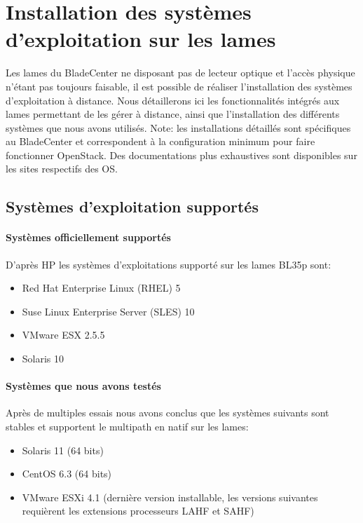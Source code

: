 \documentclass[a4paper,oneside]{report}
\begin{document}
\chapter{Installation des systèmes d'exploitation sur les lames} \label{sec:installos}
Les lames du BladeCenter ne disposant pas de lecteur optique et l'accès physique n'étant pas toujours faisable, il est possible de réaliser l'installation des systèmes d'exploitation à distance.
Nous détaillerons ici les fonctionnalités intégrés aux lames permettant de les gérer à distance, ainsi que l'installation des différents systèmes que nous avons utilisés.\newline
Note: les installations détaillés sont spécifiques au BladeCenter et correspondent à la configuration minimum pour faire fonctionner OpenStack. Des documentations plus exhaustives sont disponibles sur les sites respectifs des OS.

\section{Systèmes d'exploitation supportés} \label{sec:compatse}
\subsubsection{Systèmes officiellement supportés}
D'après HP les systèmes d'exploitations supporté sur les lames BL35p sont:
\begin{itemize}
\item Red Hat Enterprise Linux (RHEL) 5
\item Suse Linux Enterprise Server (SLES) 10
\item VMware ESX 2.5.5
\item Solaris 10
\end{itemize}

\subsubsection{Systèmes que nous avons testés}
Après de multiples essais nous avons conclus que les systèmes suivants sont stables et supportent le multipath en natif sur les lames:
\begin{itemize}
\item Solaris 11 (64 bits)
\item CentOS 6.3 (64 bits)
\item VMware ESXi 4.1 (dernière version installable, les versions suivantes requièrent les extensions processeurs LAHF et SAHF)
\end{itemize}
\end{document}

